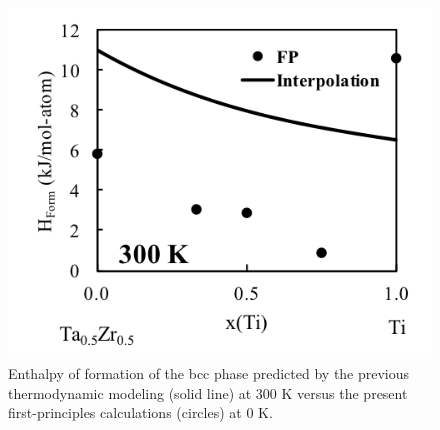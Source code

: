 \newpage
\begin{figure}[H]
	\centering
	\includegraphics{Chapter-3/Figures/TiTaZr2.png}
	\caption{Enthalpy of formation of the bcc phase predicted by the previous thermodynamic modeling (solid line) at 300 K versus the present first-principles calculations (circles) at 0 K.}
	\label{Ch3-figure:TiTaZr2}
\end{figure}